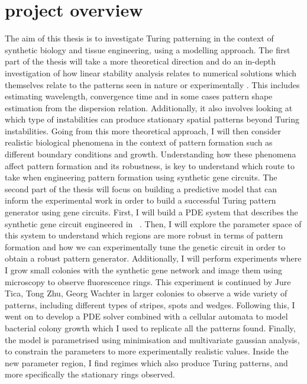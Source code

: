 \section{project overview}
The aim of this thesis is to investigate Turing patterning in the context of synthetic biology and tissue engineering, using a modelling approach.
The first part of the thesis will take a more theoretical direction and do an in-depth investigation of how linear stability analysis relates to numerical solutions which themselves relate to the patterns seen in nature or experimentally .
This includes estimating wavelength, convergence time and in some cases pattern shape estimation from the dispersion relation.
Additionally, it also involves looking at which type of instabilities can produce stationary spatial patterns beyond Turing instabilities.
Going from this more theoretical approach, I will then consider realistic biological phenomena in the context of pattern formation such as different boundary conditions and growth.
Understanding how these phenomena affect pattern formation and its robustness, is key to understand which route to take when engineering pattern formation using synthetic gene circuits.
The second part of the thesis will focus on building a predictive model that can inform the experimental work in order to build a successful Turing pattern generator using gene circuits.
First, I will build a PDE system that describes the synthetic gene circuit engineered in ~\parencite{Tica2020}.
Then, I will explore the parameter space of this system to understand which regions are more robust in terms of pattern formation and how we can experimentally tune the genetic circuit in order to obtain a robust pattern generator.
Additionally, I will perform experiments where I grow small colonies with the synthetic gene network and image them using microscopy to observe fluorescence rings.
This experiment is continued by Jure Tica, Tong Zhu, Georg Wachter in larger colonies to observe a wide variety of patterns, including different types of stripes, spots and wedges.
Following this, I went on to develop a PDE solver combined with a cellular automata to model bacterial colony growth which I used to replicate all the patterns found.
Finally, the model is parametrised using minimisation and multivariate gaussian analysis, to constrain the parameters to more experimentally realistic values.
Inside the new parameter region, I find regimes which also produce Turing patterns, and more specifically the stationary rings observed.



